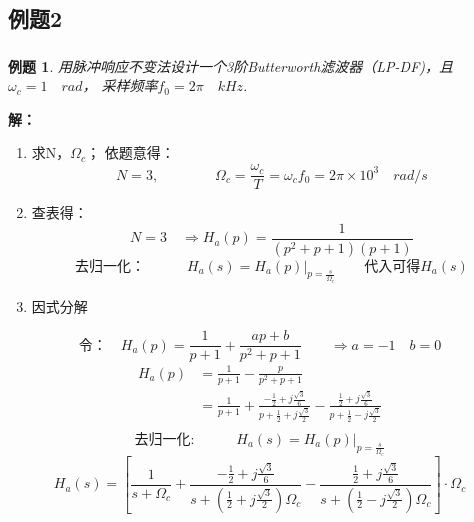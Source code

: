 \documentclass[notheorems,compress,mathserif,table]{beamer}
\newtheorem{example}{例题}
\begin{document}
\subsection*{例题2}
\begin{frame}[allowframebreaks]\frametitle{}%
\begin{example}
用脉冲响应不变法设计一个3阶Butterworth滤波器（LP-DF)，且$\omega_c = 1\quad rad$，
采样频率$f_0 = 2\pi\quad kHz$.
\end{example}
\par \textbf{解：}
\begin{enumerate}
  \item 求N，$\Omega_c$；
      依题意得：
      $$N=3,\qquad\qquad \Omega_c = \frac{\omega_c}{T}=\omega_c f_0 = 2\pi\times 10^3 \quad rad/s$$
  \item 查表得：
      $$N = 3\quad \Longrightarrow H_a(p) = \frac{1}{(p^2 + p+1)(p+1)}$$
      $$\mbox{去归一化：}\quad\quad\quad
      H_a(s) = H_a(p)\Big|_{p=\frac{s}{\Omega_c}}\quad\quad\mbox{代入可得$H_a(s)$}$$
  \item 因式分解
  \end{enumerate}
  $$\mbox{令：}\quad H_a(p) = \frac{1}{p+1}+\frac{ap+b}{p^2+p+1}\quad\quad
  \Longrightarrow a=-1\quad b=0$$
  \begin{equation*}
  \begin{split}
  H_a(p)
           &= \frac{1}{p+1}-\frac{p}{p^2+p+1}\\
           &= \frac{1}{p+1}+
              \frac{-\frac{1}{2}+j\frac{\sqrt{3}}{6}}
                        {p+\frac{1}{2}+j\frac{\sqrt{3}}{2}}-
              \frac{\frac{1}{2}+j\frac{\sqrt{3}}{6}}
                        {p+\frac{1}{2}-j\frac{\sqrt{3}}{2}}\\
  \end{split}
  \end{equation*}
  $$\mbox{去归一化:}\quad\quad\quad  H_a(s) = H_a(p)\Big|_{p=\frac{s}{\Omega_c}}$$
  $$H_a(s)= \left[\frac{1}{s+\Omega_c}+
            \frac{-\frac{1}{2}+j\frac{\sqrt{3}}{6}}
                {s+(\frac{1}{2}+j\frac{\sqrt{3}}{2})\Omega_c}-
            \frac{\frac{1}{2}+j\frac{\sqrt{3}}{6}}
                {s+(\frac{1}{2}-j\frac{\sqrt{3}}{2})\Omega_c}\right]\cdot\Omega_c
  $$
\end{frame}
\end{document}
